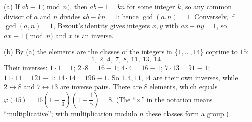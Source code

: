 (a) If $ab\equiv1\pmod n$, then $ab-1=kn$ for some integer $k$, so any common divisor of $a$ and $n$ divides $ab-kn=1$; hence $\gcd(a,n)=1$. Conversely, if $\gcd(a,n)=1$, Bezout's identity gives integers $x,y$ with $ax+ny=1$, so $ax\equiv1\pmod n$ and $x$ is an inverse.

(b) By (a) the elements are the classes of the integers in $\{1,\dots,14\}$ coprime to $15$:
\[
1,\ 2,\ 4,\ 7,\ 8,\ 11,\ 13,\ 14 .
\]
Their inverses: $1\cdot1=1$; $2\cdot8=16\equiv1$; $4\cdot4=16\equiv1$; $7\cdot13=91\equiv1$; $11\cdot11=121\equiv1$; $14\cdot14=196\equiv1$. So $1,4,11,14$ are their own inverses, while $2\leftrightarrow8$ and $7\leftrightarrow13$ are inverse pairs. There are $\boxed{8}$ elements, which equals $\varphi(15)=15\left(1-\dfrac{1}{3}\right)\left(1-\dfrac{1}{5}\right)=8$. (The ``$\times$'' in the notation means ``multiplicative''; with multiplication modulo $n$ these classes form a group.)

